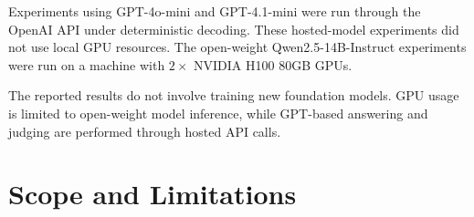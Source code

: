 \documentclass{article}
\theoremstyle{plain}
\theoremstyle{definition}
\theoremstyle{remark}
\begin{document}
Experiments using GPT-4o-mini and GPT-4.1-mini were run through the
OpenAI API under deterministic decoding. These hosted-model experiments did
not use local GPU resources. The open-weight Qwen2.5-14B-Instruct
experiments were run on a machine with \(2\times\) NVIDIA H100
80GB GPUs.

The reported results do not involve training new foundation models. 
GPU usage is limited to open-weight model inference, while GPT-based
answering and judging are performed through hosted API calls.

\section{Scope and Limitations}
\label{app:limitations}






\end{document}
